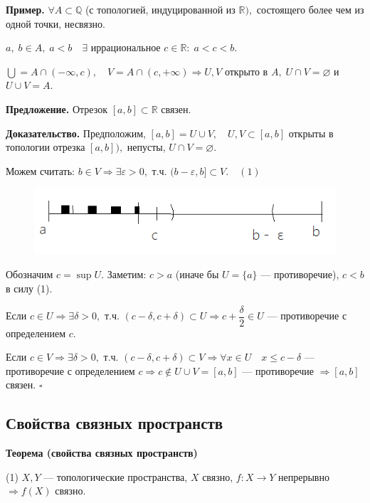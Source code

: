 \documentclass[12pt,a4paper]{article}
\begin{document}
\textbf{Пример.} $\forall A \subset \mathbb{Q}$ (с топологией, индуцированной из $\mathbb{R}),$ состоящего более чем из одной точки, несвязно.

$a, \; b \in A, \; a  < b \quad \exists$ иррациональное $c \in \mathbb{R}: \; a < c < b.$ 

$\bigcup = A \cap (-\infty, c), \quad V = A \cap (c, +\infty) \Rightarrow U, V$ открыто в $A, \; U \cap V = \varnothing$ и $U \cup V = A.$

\textbf{Предложение.} Отрезок $[a, b] \subset \mathbb{R}$ связен.

\textbf{Доказательство.} Предположим, $[a, b] = U \cup V, \quad U, V \subset [a, b]$ открыты в топологии отрезка $[a, b]),$ непусты, $U \cap V = \varnothing.$

Можем считать: $b \in V \Rightarrow \exists \varepsilon > 0,$ т.ч. $(b - \varepsilon, b] \subset V. \quad (1)$ 

\begin{figure}
	\includegraphics[width=1\linewidth]{lect8_1.png}
\end{figure}

Обозначим $c = \sup U.$ Заметим: $c > a$ (иначе бы $U = \{a\}$ --- противоречие), $c < b$ в силу (1). 

Если $c \in U \Rightarrow \exists \delta > 0,$ т.ч. $(c - \delta, c + \delta) \subset U \Rightarrow c + \dfrac{\delta}{2} \in U$ --- противоречие с определением $c.$

Если $c \in V \Rightarrow \exists \delta > 0,$ т.ч. $(c - \delta, c + \delta) \subset V \Rightarrow \forall x \in U \quad x \leq c - \delta$ --- противоречие с определением $c \Rightarrow c \not \in U \cup V = [a, b]$ --- противоречие $\Rightarrow [a, b]$ связен. $\square$ 

\subsection{Свойства связных пространств}

\textbf{Теорема (свойства связных пространств)}

(1) $X, Y$ --- топологические пространства, $X$ связно, $f: X \to Y$ непрерывно $\Rightarrow f(X)$ связно. 
\end{document}
